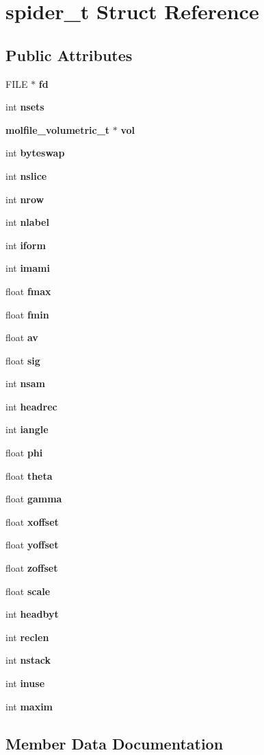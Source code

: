 \section{spider\_\-t  Struct Reference}
\label{structspider__t}
\subsection*{Public Attributes}
\begin{CompactItemize}
\item 
FILE $\ast$ {\bf fd}
\item 
int {\bf nsets}
\item 
{\bf molfile\_\-volumetric\_\-t} $\ast$ {\bf vol}
\item 
int {\bf byteswap}
\item 
int {\bf nslice}
\item 
int {\bf nrow}
\item 
int {\bf nlabel}
\item 
int {\bf iform}
\item 
int {\bf imami}
\item 
float {\bf fmax}
\item 
float {\bf fmin}
\item 
float {\bf av}
\item 
float {\bf sig}
\item 
int {\bf nsam}
\item 
int {\bf headrec}
\item 
int {\bf iangle}
\item 
float {\bf phi}
\item 
float {\bf theta}
\item 
float {\bf gamma}
\item 
float {\bf xoffset}
\item 
float {\bf yoffset}
\item 
float {\bf zoffset}
\item 
float {\bf scale}
\item 
int {\bf headbyt}
\item 
int {\bf reclen}
\item 
int {\bf nstack}
\item 
int {\bf inuse}
\item 
int {\bf maxim}
\end{CompactItemize}


\subsection{Member Data Documentation}
